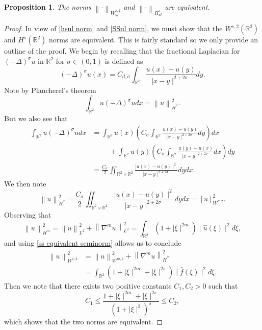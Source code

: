 \documentclass[12pt,xcolor=svgnames]{amsart}
\newtheorem{proposition}[theorem]{Proposition}
\newcommand{\R}{\mathbb{R}}
\newcommand{\abs}[1]{\mid\!#1\!\mid}
\newcommand{\norm}[2]{\left\lVert#1\right\rVert_{#2}}
\begin{document}
\begin{proposition}
\label{SS equivalent norm}The norms $\norm {\cdot}{W_{ul}^{s,2}}$ and $\norm{\cdot}{H_{ul}^s}$ are equivalent.
\end{proposition}
\begin{proof}
In view of \eqref{hsul norm} and \eqref{SSul norm}, we must show that the $W^{s,2}(\R^2)$ and $H^s(\R^2)$ norms are equivalent. This is fairly standard so we only provide an outline of the proof. We begin by recalling that the fractional Laplacian for $(-\Delta)^{\sigma}u$ in $\R^2$  for $\sigma \in (0,1)$ is defined as 
$$
(-\Delta)^{\sigma}u(x) = C_{d,\sigma}\int_{\R^2} \frac{u(x)-u(y)}{\abs{x-y}^{2+2\sigma}}dy.
$$
Note by Plancherel's theorem
$$
\int_{\R^2} u (-\Delta)^{\sigma} u dx = \norm{u}{\dot{H}^{\sigma}}^2.
$$
But we also see that 
\begin{align*}
\int_{\R^2} u (-\Delta)^{\sigma} u dx &= \int_{\R^2} u(x) \left(C_{\sigma}\int_{\R^2} \frac{u(x)-u(y)}{\abs{x-y}^{2+2\sigma}}dy\right)dx\\&\hspace{1cm}+ \int_{\R^2} u(y) \left(C_{\sigma}\int_{\R^2} \frac{u(y)-u(x)}{\abs{x-y}^{2+2\sigma}}dx\right)dy\\
&=
\frac{C_{\sigma}}{2} \iint_{\R^2 \times \R^2} \frac{\abs{u(x)-u(y)}^2}{\abs{x-y}^{2+2\sigma}}dydx.
\end{align*}
We then note
\begin{equation}
\label{ss equivalent seminorm}
\norm{u}{\dot{H}^{\sigma}}^2 = \frac{C_{\sigma}}{2} \iint_{\R^2 \times \R^2} \frac{\abs{u(x)-u(y)}^2}{\abs{x-y}^{2+2\sigma}}dydx=[u]_{W^{\sigma,2}}^2.
\end{equation}
Observing that 
$$
\norm{u}{H^m}^2 = \norm{u}{L^2}^2 + \norm{\nabla^mu}{L^2}^2 = \int_{\R^2} (1+\abs{\xi}^{2m})\abs{\hat{u}(\xi)}^2d\xi,$$
and using \eqref{ss equivalent seminorm} allows us to conclude
\begin{align*}
\norm{u}{W^{s,2}}^2 &= \norm{u}{W^{m,2}}^2 + \norm{\nabla^mu}{\dot{H}^{\sigma}}^2 \\ 
&= \int_{\R^2} (1+\abs{\xi}^{2m}+\abs{\xi}^{2s})\abs{\hat{f}(\xi)}^2 d\xi.
\end{align*}
Then we note that there exists two positive constants $C_1,C_2>0$ such that 
$$
C_1 \leq \frac{1+\abs{\xi}^{2m}+\abs{\xi}^{2s}}{(1+\abs{\xi}^2)^s} \leq C_2,
$$
which shows that the two norms are equivalent.
\end{proof}
\end{document}
